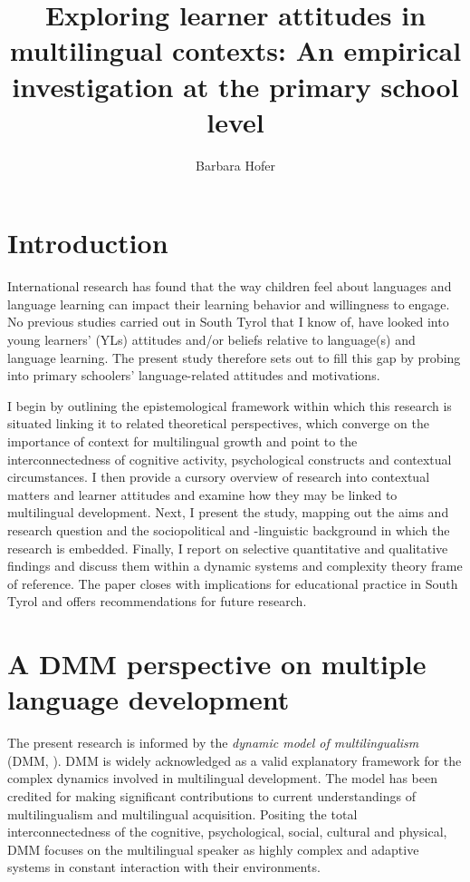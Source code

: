 \documentclass[output=paper]{../langscibook}
\author{Barbara Hofer\affiliation{Dyme Research Group, Innsbruck University}}
\title{Exploring learner attitudes in multilingual contexts: An empirical investigation at the primary school level}
\begin{document}
\maketitle 
{}





\section{Introduction}

International research has found that the way children feel about languages and language learning can impact their learning behavior and willingness to engage. No previous studies carried out in South Tyrol that I know of, have looked into young learners’ (YLs) attitudes and/or beliefs relative to language(s) and language learning. The present study therefore sets out to fill this gap by probing into primary schoolers’ language-related attitudes and motivations. 

I begin by outlining the epistemological framework within which this research is situated linking it to related theoretical perspectives, which converge on the importance of context for multilingual growth and point to the interconnectedness of cognitive activity, psychological constructs and contextual circumstances. I then provide a cursory overview of research into contextual matters and learner attitudes and examine how they may be linked to multilingual development. Next, I present the study, mapping out the aims and research question and the sociopolitical and -linguistic background in which the research is embedded. Finally, I report on selective quantitative and qualitative findings and discuss them within a dynamic systems and complexity theory frame of reference. The paper closes with implications for educational practice in South Tyrol and offers recommendations for future research.


\section{A DMM perspective on multiple language development}


The present research is informed by the \emph{dynamic model of multilingualism} (DMM, \citealt{HerdinaJessner2002}). DMM is widely acknowledged as a valid explanatory framework for the complex dynamics involved in multilingual development. The model has been credited for making significant contributions to current understandings of multilingualism and multilingual acquisition. Positing the total interconnectedness of the cognitive, psychological, social, cultural and physical, DMM focuses on the multilingual speaker as highly complex and adaptive systems in constant interaction with their environments. 
\end{document}
